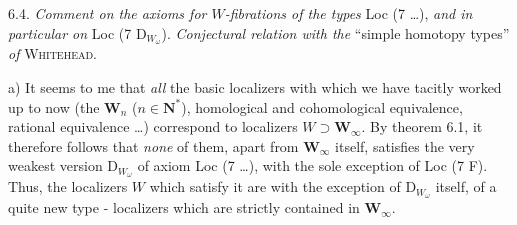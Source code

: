 \documentclass[11pt]{article}
\begin{document}
6.4. \textit{Comment on the axioms for $W$-fibrations of the types} Loc (7 \ldots), \textit{and in particular on} Loc (7 D$_{W_\omega}$). \textit{Conjectural relation with the} ``simple homotopy types'' \textit{of} \textsc{Whitehead}. %

a) It seems to me that \textit{all} the basic localizers with which we have tacitly worked up to now (the $\mathbf{W}_n$ ($n \in \mathbf{N}^*$), homological and cohomological equivalence, rational equivalence \ldots) correspond to localizers $W \supset \mathbf{W}_\infty$. By theorem 6.1, it therefore follows that \textit{none} of them, apart from $\mathbf{W}_\infty$ itself, satisfies the very weakest version D$_{W_\omega}$ of axiom Loc (7 \ldots), with the sole exception of Loc (7 F). Thus, the localizers $W$ which satisfy it are with the exception of D$_{W_\omega}$ itself, of a quite new type - localizers which are strictly contained in $\mathbf{W}_\infty$.
\end{document}
